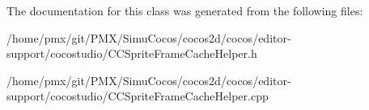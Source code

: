 The documentation for this class was generated from the following files\+:\begin{DoxyCompactItemize}
\item 
/home/pmx/git/\+P\+M\+X/\+Simu\+Cocos/cocos2d/cocos/editor-\/support/cocostudio/C\+C\+Sprite\+Frame\+Cache\+Helper.\+h\item 
/home/pmx/git/\+P\+M\+X/\+Simu\+Cocos/cocos2d/cocos/editor-\/support/cocostudio/C\+C\+Sprite\+Frame\+Cache\+Helper.\+cpp\end{DoxyCompactItemize}
